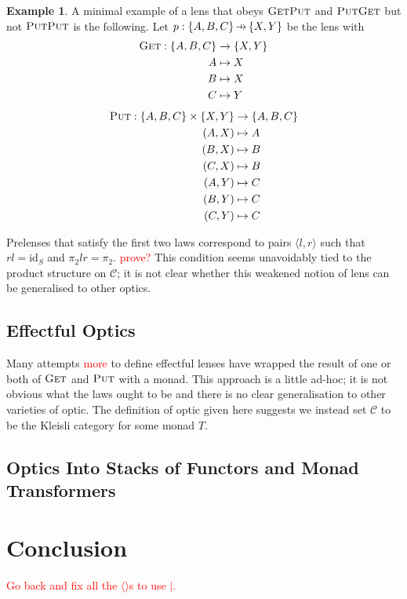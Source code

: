 \documentclass[11pt,a4paper]{article}
\theoremstyle{plain}
\theoremstyle{definition}
\newtheorem{example}[theorem]{Example}
\newcommand{\C}{\mathscr{C}}
\newcommand{\id}{\mathrm{id}}
\newcommand{\fget}{\textsc{Get}}
\newcommand{\fput}{\textsc{Put}}
\newcommand{\hto}{\ensuremath{\,\mathaccent\shortmid\rightarrow\,}}
\newcommand{\todo}[1]{\textcolor{red}{\small #1}}
\begin{document}
\begin{example}
A minimal example of a lens that obeys $\fget\fput$ and $\fput\fget$ but not $\fput\fput$ is the following. Let $p : \{A,B,C\} \hto \{X, Y\}$ be the lens with
\begin{align*}
\fget : \{A,B,C\} &\to \{X, Y\} \\
A &\mapsto X \\
B &\mapsto X \\
C &\mapsto Y 
\end{align*}
\begin{align*}
\fput : \{A,B,C\} \times \{X, Y\} &\to \{A,B,C\} \\
(A,X) &\mapsto A \\
(B,X) &\mapsto B \\
(C,X) &\mapsto B \\
(A,Y) &\mapsto C \\
(B,Y) &\mapsto C \\
(C,Y) &\mapsto C
\end{align*}
\end{example}

Prelenses that satisfy the first two laws correspond to pairs $\langle l, r \rangle$ such that $rl = \id_S$ and $\pi_2lr = \pi_2$. \todo{prove?} This condition seems unavoidably tied to the product structure on $\C$; it is not clear whether this weakened notion of lens can be generalised to other optics.

\subsection{Effectful Optics}

Many attempts \cite{ReflectionsOnMonadicLenses} \todo{more} to define effectful lenses have wrapped the result of one or both of $\fget$ and $\fput$ with a monad. This approach is a little ad-hoc; it is not obvious what the laws ought to be and there is no clear generalisation to other varieties of optic. The definition of optic given here suggests we instead set $\C$ to be the Kleisli category for some monad $T$.


\subsection{Optics Into Stacks of Functors and Monad Transformers}

\section{Conclusion}

\todo{Go back and fix all the $\langle \rangle$s to use $\mid$.}



\end{document}
